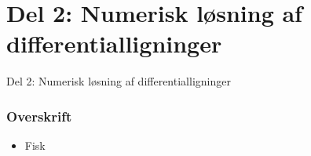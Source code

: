 \section{Del 2: Numerisk løsning af differentialligninger}
\begin{frame}
\centering
\Huge
Del 2: Numerisk løsning af differentialligninger
\end{frame}
%
\begin{frame}
\frametitle{Overskrift}
\begin{itemize}
\item Fisk
\end{itemize}
\end{frame}
